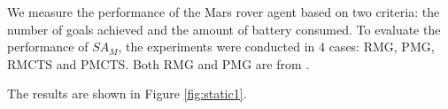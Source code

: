 \documentclass[a0, portrait]{a0poster}
\newcommand{\SA}{\emph{SA}\xspace}
\newcommand{\SAM}{\emph{$SA_M$}\xspace}
\begin{document}
\begin{multicols}{3}
We measure the performance of the Mars rover agent based on two criteria: the number of goals achieved and the amount of battery consumed.
To evaluate the performance of \SAM, the experiments were conducted in 4 cases: RMG, PMG, RMCTS and PMCTS.
%
Both RMG and PMG are from \cite{DuffHT06}.
%
%
%
%
%


%

The results are shown in Figure \ref{fig:static1}.


\end{multicols}
\end{document}
